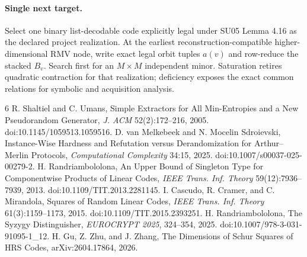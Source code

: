\documentclass[11pt]{article}
\begin{document}
\paragraph{Single next target.}
Select one binary list-decodable code explicitly legal under SU05 Lemma 4.16 as the declared project realization. At the earliest reconstruction-compatible higher-dimensional RMV node, write exact legal orbit tuples \(a(v)\) and row-reduce the stacked \(B_v\). Search first for an \(M\times M\) independent minor. Saturation retires quadratic contraction for that realization; deficiency exposes the exact common relations for symbolic and acquisition analysis.

\begin{thebibliography}{6}
 R. Shaltiel and C. Umans, Simple Extractors for All Min-Entropies and a New Pseudorandom Generator, \emph{J. ACM} 52(2):172--216, 2005. doi:10.1145/1059513.1059516.
 D. van Melkebeek and N. Mocelin Sdroievski, Instance-Wise Hardness and Refutation versus Derandomization for Arthur--Merlin Protocols, \emph{Computational Complexity} 34:15, 2025. doi:10.1007/s00037-025-00279-2.
 H. Randriambololona, An Upper Bound of Singleton Type for Componentwise Products of Linear Codes, \emph{IEEE Trans. Inf. Theory} 59(12):7936--7939, 2013. doi:10.1109/TIT.2013.2281145.
 I. Cascudo, R. Cramer, and C. Mirandola, Squares of Random Linear Codes, \emph{IEEE Trans. Inf. Theory} 61(3):1159--1173, 2015. doi:10.1109/TIT.2015.2393251.
 H. Randriambololona, The Syzygy Distinguisher, \emph{EUROCRYPT 2025}, 324--354, 2025. doi:10.1007/978-3-031-91095-1_12.
 H. Gu, Z. Zhu, and J. Zhang, The Dimensions of Schur Squares of HRS Codes, arXiv:2604.17864, 2026.
\end{thebibliography}
\end{document}
